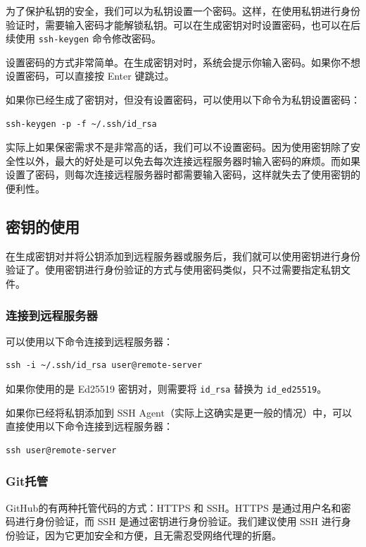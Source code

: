 \documentclass[../main.tex]{subfiles}
\begin{document}
为了保护私钥的安全，我们可以为私钥设置一个密码。这样，在使用私钥进行身份验证时，需要输入密码才能解锁私钥。可以在生成密钥对时设置密码，也可以在后续使用 \texttt{ssh-keygen} 命令修改密码。

设置密码的方式非常简单。在生成密钥对时，系统会提示你输入密码。如果你不想设置密码，可以直接按 Enter 键跳过。

如果你已经生成了密钥对，但没有设置密码，可以使用以下命令为私钥设置密码：
\begin{verbatim}
ssh-keygen -p -f ~/.ssh/id_rsa
\end{verbatim}

实际上如果保密需求不是非常高的话，我们可以不设置密码。因为使用密钥除了安全性以外，最大的好处是可以免去每次连接远程服务器时输入密码的麻烦。而如果设置了密码，则每次连接远程服务器时都需要输入密码，这样就失去了使用密钥的便利性。

\subsection{密钥的使用}

在生成密钥对并将公钥添加到远程服务器或服务后，我们就可以使用密钥进行身份验证了。使用密钥进行身份验证的方式与使用密码类似，只不过需要指定私钥文件。

\subsubsection{连接到远程服务器}

可以使用以下命令连接到远程服务器：
\begin{verbatim}
ssh -i ~/.ssh/id_rsa user@remote-server
\end{verbatim}
如果你使用的是 Ed25519 密钥对，则需要将 \texttt{id\_rsa} 替换为 \texttt{id\_ed25519}。

如果你已经将私钥添加到 SSH Agent（实际上这确实是更一般的情况）中，可以直接使用以下命令连接到远程服务器：
\begin{verbatim}
ssh user@remote-server
\end{verbatim}

\subsubsection{Git托管}

GitHub的有两种托管代码的方式：HTTPS 和 SSH。HTTPS 是通过用户名和密码进行身份验证，而 SSH 是通过密钥进行身份验证。我们建议使用 SSH 进行身份验证，因为它更加安全和方便，且无需忍受网络代理的折磨。
\end{document}
